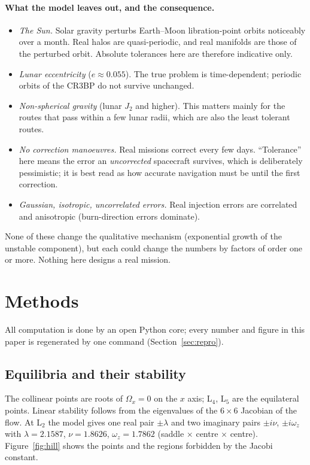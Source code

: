 \documentclass[11pt,a4paper]{article}
\begin{document}
\paragraph{What the model leaves out, and the consequence.}
\begin{itemize}\setlength\itemsep{1pt}
\item \emph{The Sun.} Solar gravity perturbs Earth--Moon libration-point orbits noticeably over a month. Real
halos are quasi-periodic, and real manifolds are those of the perturbed orbit. Absolute tolerances here are therefore indicative only.
\item \emph{Lunar eccentricity} ($e\approx0.055$). The true problem is time-dependent; periodic orbits of the CR3BP
do not survive unchanged.
\item \emph{Non-spherical gravity} (lunar $J_2$ and higher). This matters mainly for the routes that pass within a few lunar radii,
which are also the least tolerant routes.
\item \emph{No correction manoeuvres.} Real missions correct every few days. ``Tolerance'' here means the error an
\emph{uncorrected} spacecraft survives, which is deliberately pessimistic; it is best read as how accurate
navigation must be until the first correction.
\item \emph{Gaussian, isotropic, uncorrelated errors.} Real injection errors are correlated and anisotropic (burn-direction
errors dominate).
\end{itemize}
None of these change the qualitative mechanism (exponential growth of the unstable component), but each could
change the numbers by factors of order one or more. Nothing here designs a real mission.

\section{Methods}
All computation is done by an open Python core; every number and figure in this paper is regenerated by one
command (Section~\ref{sec:repro}).

\subsection{Equilibria and their stability}
The collinear points are roots of $\Omega_x=0$ on the $x$ axis; L$_4$, L$_5$ are the equilateral points.
Linear stability follows from the eigenvalues of the $6\times6$ Jacobian of the flow. At L$_2$ the model gives
one real pair $\pm\lambda$ and two imaginary pairs $\pm i\nu$, $\pm i\omega_z$ with
$\lambda=2.1587$, $\nu=1.8626$, $\omega_z=1.7862$ (saddle $\times$ centre $\times$ centre).
Figure~\ref{fig:hill} shows the points and the regions forbidden by the Jacobi constant.
\end{document}
